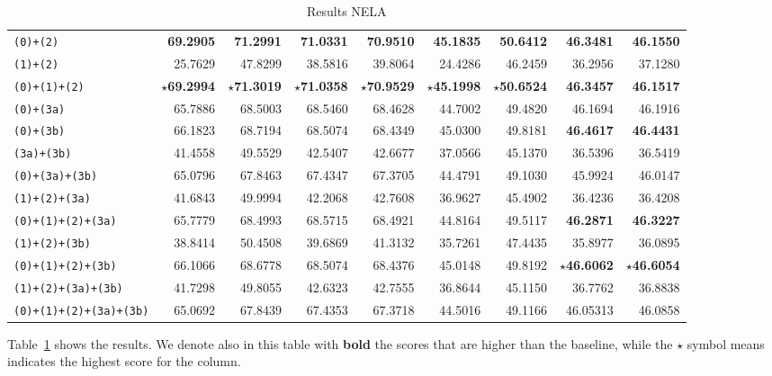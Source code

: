 \begin{table}[!htbp]
{\begin{tabular}{l|rr|rr|rr|rr}
        \texttt{(0)+(2)} & \textbf{69.2905} & \textbf{71.2991} & \textbf{71.0331} & \textbf{70.9510} & \textbf{45.1835} & \textbf{50.6412} & \textbf{46.3481} & \textbf{46.1550} \\
        \texttt{(1)+(2)} & 25.7629 & 47.8299 & 38.5816 & 39.8064 & 24.4286 & 46.2459 & 36.2956 & 37.1280 \\
        \texttt{(0)+(1)+(2)} & \textbf{$\star$69.2994} & \textbf{$\star$71.3019} & \textbf{$\star$71.0358} & \textbf{$\star$70.9529} & \textbf{$\star$45.1998} & \textbf{$\star$50.6524} & \textbf{46.3457} & \textbf{46.1517} \\
        \texttt{(0)+(3a)} & 65.7886 & 68.5003 & 68.5460 & 68.4628 & 44.7002 & 49.4820 & 46.1694 & 46.1916 \\
        \texttt{(0)+(3b)} & 66.1823 & 68.7194 & 68.5074 & 68.4349 & 45.0300 & 49.8181 & \textbf{46.4617} & \textbf{46.4431} \\
        \texttt{(3a)+(3b)} & 41.4558 & 49.5529 & 42.5407 & 42.6677 & 37.0566 & 45.1370 & 36.5396 & 36.5419 \\
        \texttt{(0)+(3a)+(3b)} & 65.0796 & 67.8463 & 67.4347 & 67.3705 & 44.4791 & 49.1030 & 45.9924 & 46.0147  \\
        \texttt{(1)+(2)+(3a)} & 41.6843 & 49.9994 & 42.2068 & 42.7608 & 36.9627 & 45.4902 & 36.4236 & 36.4208   \\
        \texttt{(0)+(1)+(2)+(3a)} & 65.7779 & 68.4993 & 68.5715 & 68.4921 & 44.8164 & 49.5117 & \textbf{46.2871} & \textbf{46.3227}  \\
        \texttt{(1)+(2)+(3b)} & 38.8414 & 50.4508 & 39.6869 & 41.3132 & 35.7261 & 47.4435 & 35.8977 & 36.0895  \\
        \texttt{(0)+(1)+(2)+(3b)} & 66.1066 & 68.6778 & 68.5074 & 68.4376 & 45.0148 & 49.8192 & \textbf{$\star$46.6062} & \textbf{$\star$46.6054} \\
        \texttt{(1)+(2)+(3a)+(3b)} & 41.7298 & 49.8055 & 42.6323 & 42.7555 & 36.8644 & 45.1150 & 36.7762 & 36.8838 \\
        \texttt{(0)+(1)+(2)+(3a)+(3b)} & 65.0692 & 67.8439 & 67.4353 & 67.3718 & 44.5016 & 49.1166 & 46.05313 & 46.0858  \\
        
    \end{tabular}
    }
    \caption{Results NELA}
    \label{tab:results_prop_features_classifier_nela}
\end{table}

Table~\ref{tab:results_prop_features_classifier_nela} shows the results. We denote also in this table with \textbf{bold} the scores that are higher than the baseline, while the $\star$ symbol means indicates the highest score for the column.

